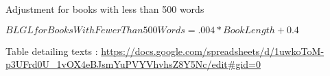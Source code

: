 Adjustment for books with less than 500 words

$BLGL for Books With Fewer Than 500 Words = .004 * Book Length + 0.4$


Table detailing texts : \url{https://docs.google.com/spreadsheets/d/1uwkoToM-p3UFrd0U_1vOX4eBJsmYuPVYVhvhsZ8Y5Nc/edit#gid=0}





